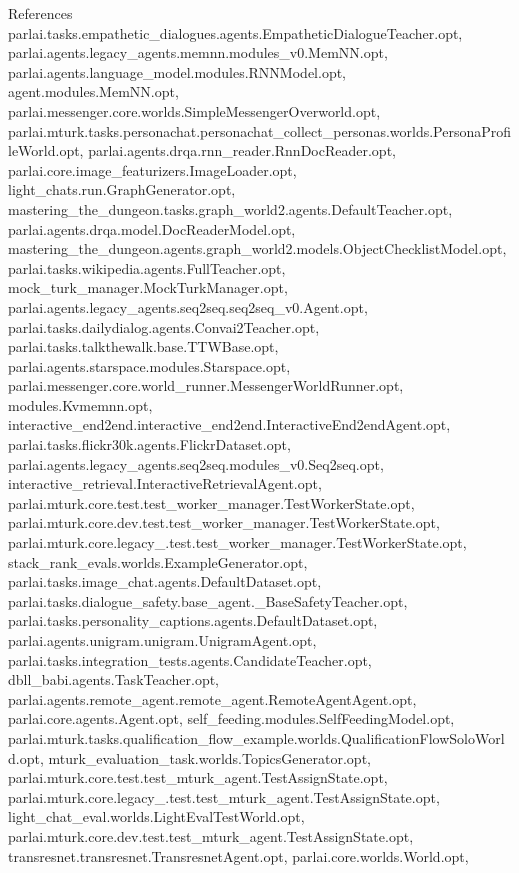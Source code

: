 References parlai.\+tasks.\+empathetic\+\_\+dialogues.\+agents.\+Empathetic\+Dialogue\+Teacher.\+opt, parlai.\+agents.\+legacy\+\_\+agents.\+memnn.\+modules\+\_\+v0.\+Mem\+N\+N.\+opt, parlai.\+agents.\+language\+\_\+model.\+modules.\+R\+N\+N\+Model.\+opt, agent.\+modules.\+Mem\+N\+N.\+opt, parlai.\+messenger.\+core.\+worlds.\+Simple\+Messenger\+Overworld.\+opt, parlai.\+mturk.\+tasks.\+personachat.\+personachat\+\_\+collect\+\_\+personas.\+worlds.\+Persona\+Profile\+World.\+opt, parlai.\+agents.\+drqa.\+rnn\+\_\+reader.\+Rnn\+Doc\+Reader.\+opt, parlai.\+core.\+image\+\_\+featurizers.\+Image\+Loader.\+opt, light\+\_\+chats.\+run.\+Graph\+Generator.\+opt, mastering\+\_\+the\+\_\+dungeon.\+tasks.\+graph\+\_\+world2.\+agents.\+Default\+Teacher.\+opt, parlai.\+agents.\+drqa.\+model.\+Doc\+Reader\+Model.\+opt, mastering\+\_\+the\+\_\+dungeon.\+agents.\+graph\+\_\+world2.\+models.\+Object\+Checklist\+Model.\+opt, parlai.\+tasks.\+wikipedia.\+agents.\+Full\+Teacher.\+opt, mock\+\_\+turk\+\_\+manager.\+Mock\+Turk\+Manager.\+opt, parlai.\+agents.\+legacy\+\_\+agents.\+seq2seq.\+seq2seq\+\_\+v0.\+Agent.\+opt, parlai.\+tasks.\+dailydialog.\+agents.\+Convai2\+Teacher.\+opt, parlai.\+tasks.\+talkthewalk.\+base.\+T\+T\+W\+Base.\+opt, parlai.\+agents.\+starspace.\+modules.\+Starspace.\+opt, parlai.\+messenger.\+core.\+world\+\_\+runner.\+Messenger\+World\+Runner.\+opt, modules.\+Kvmemnn.\+opt, interactive\+\_\+end2end.\+interactive\+\_\+end2end.\+Interactive\+End2end\+Agent.\+opt, parlai.\+tasks.\+flickr30k.\+agents.\+Flickr\+Dataset.\+opt, parlai.\+agents.\+legacy\+\_\+agents.\+seq2seq.\+modules\+\_\+v0.\+Seq2seq.\+opt, interactive\+\_\+retrieval.\+Interactive\+Retrieval\+Agent.\+opt, parlai.\+mturk.\+core.\+test.\+test\+\_\+worker\+\_\+manager.\+Test\+Worker\+State.\+opt, parlai.\+mturk.\+core.\+dev.\+test.\+test\+\_\+worker\+\_\+manager.\+Test\+Worker\+State.\+opt, parlai.\+mturk.\+core.\+legacy\+\_.\+test.\+test\+\_\+worker\+\_\+manager.\+Test\+Worker\+State.\+opt, stack\+\_\+rank\+\_\+evals.\+worlds.\+Example\+Generator.\+opt, parlai.\+tasks.\+image\+\_\+chat.\+agents.\+Default\+Dataset.\+opt, parlai.\+tasks.\+dialogue\+\_\+safety.\+base\+\_\+agent.\+\_\+\+Base\+Safety\+Teacher.\+opt, parlai.\+tasks.\+personality\+\_\+captions.\+agents.\+Default\+Dataset.\+opt, parlai.\+agents.\+unigram.\+unigram.\+Unigram\+Agent.\+opt, parlai.\+tasks.\+integration\+\_\+tests.\+agents.\+Candidate\+Teacher.\+opt, dbll\+\_\+babi.\+agents.\+Task\+Teacher.\+opt, parlai.\+agents.\+remote\+\_\+agent.\+remote\+\_\+agent.\+Remote\+Agent\+Agent.\+opt, parlai.\+core.\+agents.\+Agent.\+opt, self\+\_\+feeding.\+modules.\+Self\+Feeding\+Model.\+opt, parlai.\+mturk.\+tasks.\+qualification\+\_\+flow\+\_\+example.\+worlds.\+Qualification\+Flow\+Solo\+World.\+opt, mturk\+\_\+evaluation\+\_\+task.\+worlds.\+Topics\+Generator.\+opt, parlai.\+mturk.\+core.\+test.\+test\+\_\+mturk\+\_\+agent.\+Test\+Assign\+State.\+opt, parlai.\+mturk.\+core.\+legacy\+\_.\+test.\+test\+\_\+mturk\+\_\+agent.\+Test\+Assign\+State.\+opt, light\+\_\+chat\+\_\+eval.\+worlds.\+Light\+Eval\+Test\+World.\+opt, parlai.\+mturk.\+core.\+dev.\+test.\+test\+\_\+mturk\+\_\+agent.\+Test\+Assign\+State.\+opt, transresnet.\+transresnet.\+Transresnet\+Agent.\+opt, parlai.\+core.\+worlds.\+World.\+opt, 